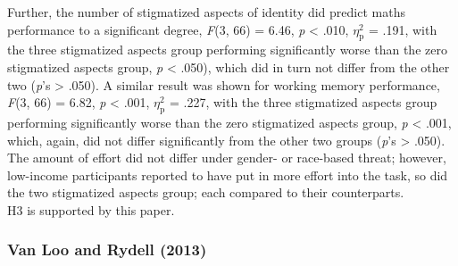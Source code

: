 \documentclass[
  stu,floatsintext]{apa7}
\begin{document}
Further, the number of stigmatized aspects of identity did predict maths performance to a significant degree, \emph{F}(3, 66) = 6.46, \emph{p} \textless{} .010, \(\eta^{2}_{\text{p}}\) = .191, with the three stigmatized aspects group performing significantly worse than the zero stigmatized aspects group, \emph{p} \textless{} .050), which did in turn not differ from the other two (\emph{p}'s \textgreater{} .050).
A similar result was shown for working memory performance, \emph{F}(3, 66) = 6.82, \emph{p} \textless{} .001, \(\eta^{2}_{\text{p}}\) = .227, with the three stigmatized aspects group performing significantly worse than the zero stigmatized aspects group, \emph{p} \textless{} .001, which, again, did not differ significantly from the other two groups (\emph{p}'s \textgreater{} .050).
The amount of effort did not differ under gender- or race-based threat; however, low-income participants reported to have put in more effort into the task, so did the two stigmatized aspects group; each compared to their counterparts.\\
H3 is supported by this paper.

\subsubsection{Van Loo and Rydell (2013)}\label{vanlooexperiencefeelingpowerful2013}
\end{document}
